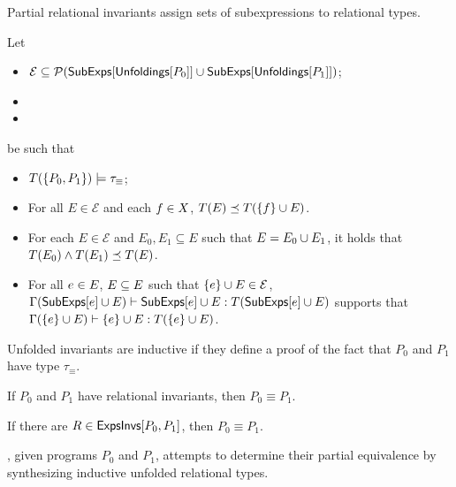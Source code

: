 %
Partial relational invariants assign sets of subexpressions to
relational types.
%
\begin{defn}
  \label{defn:inferred-invs}
  Let
  \begin{itemize}
  \item 
    $\mathcal{E} \subseteq \mathcal{P}(\mathsf{SubExps}[  \mathsf{Unfoldings}[ P_0 ]  ] \cup
      \mathsf{SubExps}[ \mathsf{Unfoldings}[ P_1 ]  ])$;
  \item
  \item
  \end{itemize}
  be such that 
  \begin{itemize}
  \item 
    $T( \{  P_0, P_1  \} ) \models \tau_{ \equiv }$; 
  \item 
    For all $E \in \mathcal{E}$ and each $f \in X$, $T(E) \preceq
    T(\{  f  \} \cup  E )$.
  \item 
    For each $E \in \mathcal{E}$ and $E_0, E_1 \subseteq E$ such that
    $E = E_0 \cup E_1$, it holds that $T(E_0) \land T(E_1) \preceq
    T(E)$.
  \item 
    For all $e \in E$, $E \subseteq E$ such that $\{  e  \} \cup  E
     \in \mathcal{ E }$, $\Gamma(\mathsf{SubExps}[ e ] \cup E) \vdash
    \mathsf{SubExps}[  e  ] \cup E : T( \mathsf{SubExps}[ e ] \cup E)$ supports that
    $\Gamma(\{  e  \} \cup  E ) \vdash \{  e  \} \cup  E  : T(\{  e  \} \cup  E
    )$.
  \end{itemize}
\end{defn}
%
%

Unfolded invariants are inductive if they define a proof of the fact
that $P_0$ and $P_1$ have type $\tau_{\equiv}$.
% 
\begin{defn}
  \label{defn:ind-unfolded}
\end{defn}

If $P_0$ and $P_1$ have relational invariants, then $P_0 \equiv P_1$.
%
\begin{lemma}
  \label{lemma:equiv-evidence}
  If there are $R \in \mathsf{ExpsInvs}[ P_0, P_1 ]$, then $P_0 \equiv P_1$.
\end{lemma}
%
\sys, given programs $P_0$ and $P_1$, attempts to determine their
partial equivalence by synthesizing inductive unfolded relational
types.

